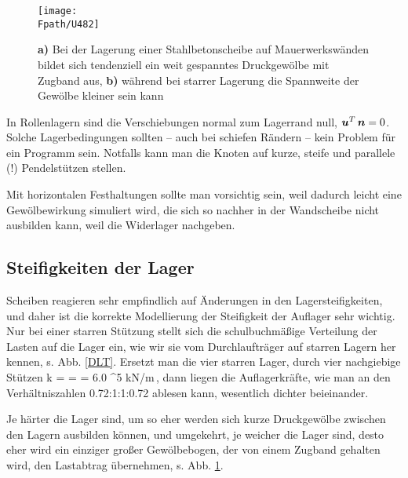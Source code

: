 {%
\begin{figure}[tbp] \centering
\if {} \sidecaption \fi
\texttt{[image: \\Fpath/U482]}
\caption{{\bf a)} Bei der Lagerung einer Stahlbetonscheibe auf Mauerwerksw\"{a}nden bildet
sich tendenziell ein weit gespanntes Druckgew\"{o}lbe mit Zugband aus, {\bf b)} w\"{a}hrend bei
starrer Lagerung die Spannweite der Gew\"{o}lbe kleiner sein kann} \label{DLTSP}
\end{figure}%

In Rollenlagern sind die Verschiebungen normal zum Lagerrand null, $\mbox{\boldmath $u$}^T\,\mbox{\boldmath $n$} = 0$. Solche Lagerbedingungen sollten -- auch bei schiefen R\"{a}ndern -- kein Problem f\"{u}r ein Programm sein. Notfalls kann man die Knoten auf kurze, steife und parallele (!) Pendelst\"{u}tzen stellen.


Mit horizontalen Festhaltungen sollte man vorsichtig sein, weil dadurch leicht eine Gew\"{o}lbewirkung simuliert
wird, die sich so nachher in der Wandscheibe nicht ausbilden kann, weil die Widerlager
nachgeben.

{\textcolor{sectionTitleBlue}{\subsection{Steifigkeiten der Lager}}}
Scheiben reagieren sehr empfindlich auf \"{A}nderungen in den Lagersteifigkeiten, und daher ist die korrekte Modellierung der Steifigkeit der Auflager sehr wichtig. Nur bei einer starren St\"{u}tzung stellt sich die schulbuchm\"{a}{\ss}ige Verteilung der Lasten auf die Lager ein, wie wir sie vom Durchlauftr\"{a}ger auf starren Lagern her kennen, s. Abb. \ref{DLT}. Ersetzt man die vier starren Lager, durch vier nachgiebige St\"{u}tzen
\bfo
k =  =  = 6.0 ^5 \mbox{kN/m}\,,
\efo
dann liegen die Auflagerkr\"{a}fte, wie man an den Verh\"{a}ltniszahlen 0.72:1:1:0.72 ablesen kann, wesentlich dichter beieinander.

Je h\"{a}rter die Lager sind, um so eher werden sich kurze Druckgew\"{o}lbe zwischen den Lagern ausbilden k\"{o}nnen, und umgekehrt, je weicher die Lager sind, desto eher wird ein einziger gro{\ss}er Gew\"{o}lbebogen, der von einem Zugband gehalten wird, den Lastabtrag \"{u}bernehmen, s. Abb. \ref{DLTSP}.

}
